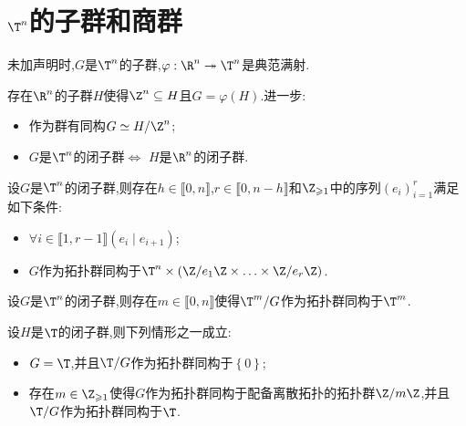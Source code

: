\section{\texorpdfstring{$\T^{n}$}{Tn}的子群和商群}

未加声明时,$G$是$\T^{n}$的子群,$\varphi:\R^{n}\twoheadrightarrow\T^{n}$是典范满射.

\begin{proposition}{}{}
	存在$\R^{n}$的子群$H$使得$\Z^{n}\subseteq H$且$G=\varphi\left(H\right)$.进一步:
	\begin{itemize}
		\item 作为群有同构$G\simeq H/\Z^{n}$;
		\item $G$是$\T^{n}$的闭子群$\iff$ $H$是$\R^{n}$的闭子群.
	\end{itemize}
\end{proposition}

\begin{theorem}{}{}
	设$G$是$\T^{n}$的闭子群,则存在$h\in\llbracket 0,n\rrbracket$,$r\in\llbracket 0,n-h\rrbracket$和$\Z_{\geqslant 1}$中的序列$\left(e_{i}\right)_{i=1}^{r}$满足如下条件:
	\begin{itemize}
		\item $\forall i\in\llbracket 1,r-1\rrbracket\left(e_{i}\mid e_{i+1}\right)$;
		\item $G$作为拓扑群同构于$\T^{n}\times\left(\Z/e_{1}\Z\times\ldots\times\Z/e_{r}\Z\right)$.
	\end{itemize}
\end{theorem}

\begin{theorem}{}{}
	设$G$是$\T^{n}$的闭子群,则存在$m\in\llbracket 0,n\rrbracket$使得$\T^{m}/G$作为拓扑群同构于$\T^{m}$.
\end{theorem}

\begin{corollary}{}{}
	设$H$是$\T$的闭子群,则下列情形之一成立:
	\begin{itemize}
		\item $G=\T$,并且$\T/G$作为拓扑群同构于$\left\{0\right\}$;
		\item 存在$m\in\Z_{\geqslant 1}$使得$G$作为拓扑群同构于配备离散拓扑的拓扑群$\Z/m\Z$,并且$\T/G$作为拓扑群同构于$\T$.
	\end{itemize}
\end{corollary}
